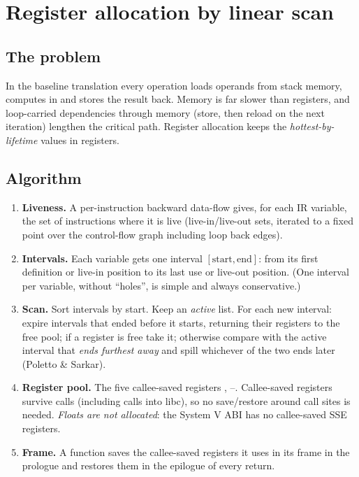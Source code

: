 \section{Register allocation by linear scan}\label{sec:regalloc}
\subsection{The problem}
In the baseline translation every operation loads operands from stack memory, computes in  and stores the result back. Memory is far slower than registers, and loop-carried dependencies through memory (store, then reload on the next iteration) lengthen the critical path. Register allocation keeps the \emph{hottest-by-lifetime} values in registers.

\subsection{Algorithm}
\begin{enumerate}
  \item \textbf{Liveness.} A per-instruction backward data-flow gives, for each IR variable, the set of instructions where it is live (live-in/live-out sets, iterated to a fixed point over the control-flow graph including loop back edges).
  \item \textbf{Intervals.} Each variable gets one interval $[\mathrm{start},\mathrm{end}]$: from its first definition or live-in position to its last use or live-out position. (One interval per variable, without ``holes'', is simple and always conservative.)
  \item \textbf{Scan.} Sort intervals by start. Keep an \emph{active} list. For each new interval: expire intervals that ended before it starts, returning their registers to the free pool; if a register is free take it; otherwise compare with the active interval that \emph{ends furthest away} and spill whichever of the two ends later (Poletto \& Sarkar).
  \item \textbf{Register pool.} The five callee-saved registers , --. Callee-saved registers survive calls (including calls into libc), so no save/restore around call sites is needed. \emph{Floats are not allocated}: the System V ABI has no callee-saved SSE registers.
  \item \textbf{Frame.} A function saves the callee-saved registers it uses in its frame in the prologue and restores them in the epilogue of every return.
\end{enumerate}


